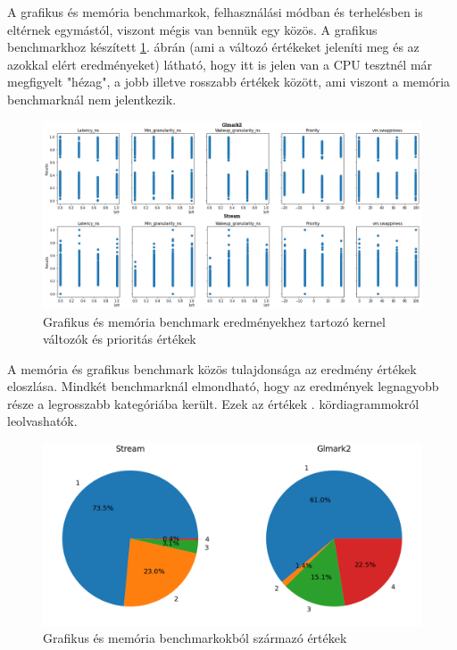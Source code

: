 A grafikus és memória benchmarkok, felhasználási módban és terhelésben is eltérnek egymástól, viszont mégis van bennük egy közös.
A grafikus benchmarkhoz készített \ref{fig:GraphicsAndMemoryParameters}. ábrán (ami a változó értékeket jeleníti meg és az azokkal elért eredményeket) látható, hogy itt is jelen van a CPU tesztnél már megfigyelt "hézag", a jobb illetve rosszabb értékek között, ami viszont a memória benchmarknál nem jelentkezik.

\begin{figure}[h!]
\centering
\includegraphics[scale=0.35]{images/graphicsAndMemoryBenchmarkValue.png}
\caption{Grafikus és memória benchmark eredményekhez tartozó kernel változók és prioritás értékek}
\label{fig:GraphicsAndMemoryParameters}
\end{figure}

A memória és grafikus benchmark közös tulajdonsága az eredmény értékek eloszlása. Mindkét benchmarknál elmondható, hogy az eredmények legnagyobb része a legrosszabb kategóriába került.
Ezek az értékek .  kördiagrammokról leolvashatók.

\begin{figure}[h!]
\centering
\includegraphics[width=\textwidth]{images/graphicsAndMemoryBenchmarkChart.png}
\caption{Grafikus és memória benchmarkokból származó értékek}
\label{fig:GraphicsAndMemoryChart}
\end{figure}

